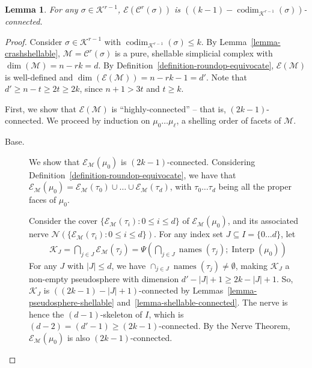 \documentclass[11pt]{article}
\newcommand{\cC}{\ensuremath{\mathcal{C}}}
\newcommand{\cE}{\ensuremath{\mathcal{E}}}
\newcommand{\cK}{\ensuremath{\mathcal{K}}}
\newcommand{\cM}{\ensuremath{\mathcal{M}}}
\newcommand{\cN}{\ensuremath{\mathcal{N}}}
\DeclareMathOperator{\codim}{codim}
\DeclareMathOperator{\names}{names}\DeclareMathOperator{\name}{name}\DeclareMathOperator{\sgn}{sgn}
\newtheorem{lemma}[theorem]{Lemma}
\newcommand{\set}[1]{\{#1\}}
\DeclareMathOperator{\interp}{Interp}
\begin{document}
\begin{lemma}
\label{lemma-lasttwo:conn}
For any $\sigma \in \cK^{r-1}$,
$\cE(\cC^r(\sigma))$ is
$((k - 1) - \codim_{\cK^{r-1}}(\sigma))$-connected.
\end{lemma}
\begin{proof}
Consider $\sigma \in \cK^{r-1}$ with $\codim_{\cK^{r-1}}(\sigma) \le k$.
By Lemma~\ref{lemma-crashshellable},
$\cM = \cC^r(\sigma)$ is a pure, shellable simplicial complex with $\dim(\cM) = n - rk = d$.
By Definition~\ref{definition-roundop-equivocate},
$\cE(\cM)$ is well-defined and
$\dim(\cE(\cM)) = n - rk - 1 = d'$.
Note that $d' \ge n - t \ge 2t \ge 2k$,
since $n + 1 > 3t$ and $t \ge k$.

First,
we show that $\cE(\cM)$ is ``highly-connected'' -- that is, $(2k - 1)$-connected.
We proceed by induction on $\mu_0 \ldots \mu_{\ell}$,
a shelling order of facets of $\cM$.
\begin{description}
	\item[Base.] We show that $\cE_{\cM}(\mu_0)$ is $(2k - 1)$-connected.
Considering Definition~\ref{definition-roundop-equivocate},
we have that $\cE_{\cM}(\mu_0) = \cE_{\cM}(\tau_0) \cup \ldots \cup \cE_{\cM}(\tau_d)$,
with $\tau_0 \ldots \tau_d$ being all the proper faces of $\mu_0$.


Consider the cover $\set{\cE_{\cM}(\tau_i): 0 \le i \le d}$ of $\cE_{\cM}(\mu_0)$,
and its associated nerve $\cN(\set{\cE_{\cM}(\tau_i): 0 \le i \le d})$.
For any index set $J \subseteq I = \set{0 \ldots d}$,
let
\begin{align*}
\cK_J =
\bigcap_{j \in J} \cE_{\cM}(\tau_j) = \Psi(\bigcap_{j \in J} \names(\tau_j); \interp(\mu_0))
\end{align*}
For any $J$ with $|J| \le d$,
we have $\cap_{j \in J} \names(\tau_j) \ne \emptyset$,
making $\cK_J$ a non-empty pseudosphere
with dimension $d' - |J| + 1 \ge 2k - |J| + 1$.
So, $\cK_J$ is $((2k - 1) -  |J| + 1)$-connected
by Lemmas~\ref{lemma-pseudosphere-shellable} and~\ref{lemma-shellable-connected}.
The nerve is hence the $(d - 1)$-skeleton of $I$,
which is $(d - 2) = (d' - 1) \ge (2k - 1)$-connected.
By the Nerve Theorem,
$\cE_{\cM}(\mu_0)$ is also $(2k - 1)$-connected.



\end{description}
\end{proof}
\end{document}
